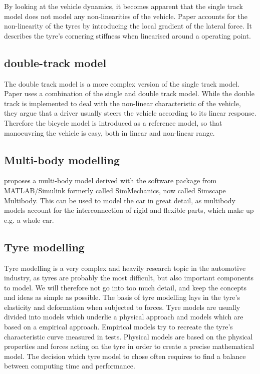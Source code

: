 \documentclass[conference]{IEEEtran}
\begin{document}
By looking at the vehicle dynamics, it becomes apparent that the single track model does not model any non-linearities of the vehicle. Paper \cite{vandersande} accounts for the non-linearity of the tyres by introducing the local gradient of the lateral force. It describes the tyre's cornering stiffness when linearised around a operating point.


\subsection{double-track model}
The double track model is a more complex version of the single track model. 
Paper \cite{Song} uses a combination of the single and double track model. While the double track is implemented to deal with the non-linear characteristic of the vehicle, they argue that a driver usually steers the vehicle according to its linear response. Therefore the bicycle model is introduced as a reference model, so that manoeuvring the vehicle is easy, both in linear and non-linear range.

\subsection{Multi-body modelling}

\cite{vandersande} proposes a multi-body model derived with the software package from MATLAB/Simulink formerly called SimMechanics, now called Simscape Multibody. This can be used to model the car in great detail, as multibody models account for the interconnection of rigid and flexible parts, which make up e.g. a whole car.

\subsection{Tyre modelling}

Tyre modelling is a very complex and heavily research topic in the automotive industry, as tyres are probably the most difficult, but also important components to model. We will therefore not go into too much detail, and keep the concepts and ideas as simple as possible.
The basis of tyre modelling lays in the tyre's elasticity and deformation when subjected to forces. Tyre models are usually divided into models which underlie a physical approach and models which are based on a empirical approach. Empirical models try to recreate the tyre's characteristic curve measured in tests. Physical models are based on the physical properties and forces acting on the tyre in order to create a precise mathematical model. The decision which tyre model to chose often requires to find a balance between computing time and performance.
\end{document}
